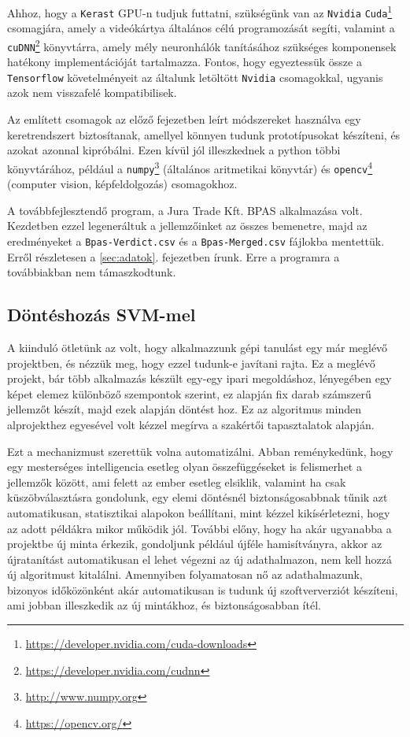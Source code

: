Ahhoz, hogy a \texttt{Kerast} GPU-n tudjuk futtatni, szükségünk van az \texttt{Nvidia}
\texttt{Cuda}\footnote{\url{https://developer.nvidia.com/cuda-downloads}} csomagjára, amely a videókártya általános célú programozását 
segíti, valamint a \texttt{cuDNN}\footnote{\url{https://developer.nvidia.com/cudnn}} könyvtárra, amely mély neuronhálók tanításához 
szükséges komponensek hatékony implementációját tartalmazza. Fontos, hogy egyeztessük
össze a \texttt{Tensorflow} követelményeit az általunk letöltött \texttt{Nvidia} csomagokkal,
ugyanis azok nem visszafelé kompatibilisek.

Az említett csomagok az előző fejezetben leírt módszereket használva egy
keretrendszert biztosítanak, amellyel könnyen tudunk prototípusokat készíteni,
és azokat azonnal kipróbálni. Ezen kívül jól illeszkednek a python többi könyvtárához,
például a \texttt{numpy}\footnote{\url{http://www.numpy.org}} (általános aritmetikai könyvtár) és \texttt{opencv}\footnote{\url{https://opencv.org/}}
(computer vision, képfeldolgozás) csomagokhoz.


A továbbfejlesztendő program, a Jura Trade Kft. BPAS alkalmazása volt. Kezdetben ezzel legeneráltuk
a jellemzőinket az összes bemenetre, majd az eredményeket a \texttt{Bpas-Verdict.csv} és
a \texttt{Bpas-Merged.csv} fájlokba mentettük. Erről részletesen a \ref{sec:adatok}.
fejezetben írunk. Erre a programra a továbbiakban nem támaszkodtunk.



\subsection{Döntéshozás SVM-mel}

A kiinduló ötletünk az volt, hogy alkalmazzunk gépi tanulást egy már meglévő projektben,
és nézzük meg, hogy ezzel tudunk-e javítani rajta. Ez a meglévő projekt, bár több 
alkalmazás készült egy-egy ipari megoldáshoz, lényegében egy képet elemez 
különböző szempontok szerint, ez alapján fix darab számszerű jellemzőt készít, 
majd ezek alapján döntést hoz. Ez az algoritmus minden alprojekthez egyesével
volt kézzel megírva a szakértői tapasztalatok alapján. 

Ezt a mechanizmust szerettük volna automatizálni. Abban reménykedünk, hogy egy 
mesterséges intelligencia esetleg olyan összefüggéseket is felismerhet a jellemzők
között, ami felett az ember esetleg elsiklik, valamint ha csak küszöbválasztásra
gondolunk, egy elemi döntésnél biztonságosabbnak tűnik azt automatikusan, statisztikai
alapokon beállítani, mint kézzel kikísérletezni, hogy az adott példákra mikor működik jól.
További előny, hogy ha akár ugyanabba a projektbe új minta érkezik, gondoljunk például újféle 
hamisítványra, akkor az újratanítást automatikusan el lehet végezni az új adathalmazon,
nem kell hozzá új algoritmust kitalálni. Amennyiben folyamatosan nő az adathalmazunk, 
bizonyos időközönként akár automatikusan is tudunk új szoftververziót készíteni,
ami jobban illeszkedik az új mintákhoz, és biztonságosabban ítél.


